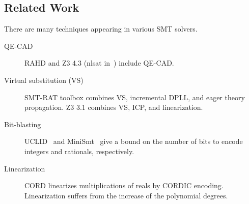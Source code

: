 \documentclass[runningheads,a4paper,oribibl]{llncs}
\newcommand{\mizuhito}[1]{\{{\bf Mizuhito:~\sf #1}\}} %
\begin{document}
\subsection{Related Work} \label{sec:relate}

There are many techniques appearing in various SMT solvers. 
\begin{description}
\item[QE-CAD] RAHD \cite{Passmore09combineddecision} and 
Z3 4.3 (nlsat in~\cite{Jovanovic13}) include QE-CAD. 

\item[Virtual substitution (VS)]
SMT-RAT toolbox \cite{smtrat} combines 
VS, incremental DPLL, and %
eager theory propagation. 
Z3 3.1 %
combines VS, ICP, and linearization.

\item[Bit-blasting] %
UCLID~\cite{Bryant07decidingbit-vector} and MiniSmt~\cite{Zankl:2010:SNR:1939141.1939168} give a bound on the number of bits 
to encode integers and rationals, respectively. %

\item[Linearization] %
CORD \cite{cordic} %
linearizes multiplications of reals by CORDIC encoding. 
Linearization suffers from the increase of the polynomial degrees. 
\end{description}
\end{document}

